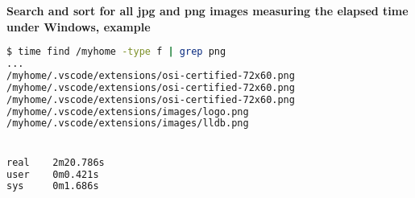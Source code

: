 \documentclass[aspectratio=1610]{beamer}
\begin{document}
\begin{frame}[fragile]
\LARGE
\textbf{Search and sort for all jpg and png images measuring the elapsed time under Windows, example}\\
\Large
\begin{lstlisting}[language=sh]
$ time find /myhome -type f | grep png
...
/myhome/.vscode/extensions/osi-certified-72x60.png
/myhome/.vscode/extensions/osi-certified-72x60.png
/myhome/.vscode/extensions/osi-certified-72x60.png
/myhome/.vscode/extensions/images/logo.png
/myhome/.vscode/extensions/images/lldb.png


real    2m20.786s
user    0m0.421s
sys     0m1.686s

\end{lstlisting}
\end{frame}
\end{document}
